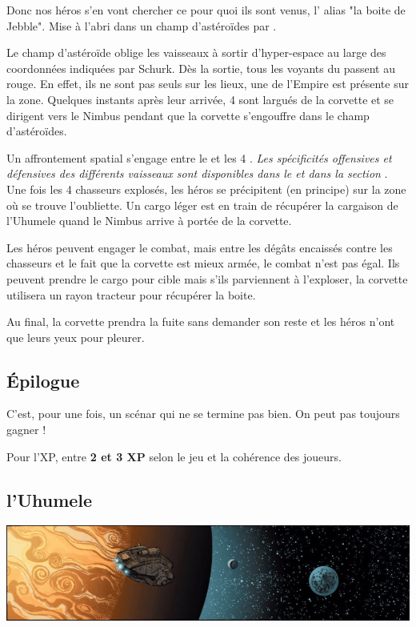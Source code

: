 Donc nos héros s’en vont chercher ce pour quoi ils sont venus, l’ alias "la boite de Jebble". Mise à l’abri dans un champ d’astéroïdes par .

Le champ d’astéroïde oblige les vaisseaux à sortir d’hyper-espace au large des coordonnées indiquées par Schurk. Dès la sortie, tous les voyants du  passent au rouge. En effet, ils ne sont pas seuls sur les lieux, une  de l’Empire est présente sur la zone. Quelques instants après leur arrivée, 4  sont largués de la corvette et se dirigent vers le Nimbus pendant que la corvette s’engouffre dans le champ d’astéroïdes.

Un affrontement spatial s’engage entre le  et les 4 . \textit{Les spécificités offensives et défensives des différents vaisseaux sont disponibles dans le  et dans la section }.\\

Une fois les 4 chasseurs explosés, les héros se précipitent (en principe) sur la zone où se trouve l’oubliette. Un cargo léger est en train de récupérer la cargaison de l’Uhumele quand le Nimbus arrive à portée de la corvette.

Les héros peuvent engager le combat, mais entre les dégâts encaissés contre les chasseurs et le fait que la corvette est mieux armée, le combat n’est pas égal. Ils peuvent prendre le cargo pour cible mais s’ils parviennent à l’exploser, la corvette utilisera un rayon tracteur pour récupérer la boite.

Au final, la corvette prendra la fuite sans demander son reste et les héros n’ont que leurs yeux pour pleurer.

\subsection{\'Epilogue}
C’est, pour une fois, un scénar qui ne se termine pas bien. On peut pas toujours gagner !

Pour l’XP, entre \textbf{2 et 3 XP} selon le jeu et la cohérence des joueurs.

\clearpage
\subsection{l’Uhumele}\label{sec:uhumele}
\noindent\includegraphics[width=\textwidth]{_img/uhumele-pano.jpg}
\\

